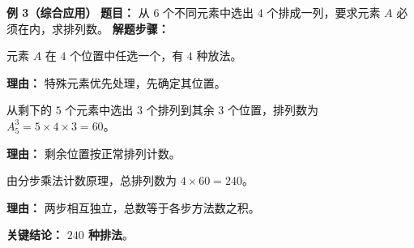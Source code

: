 \begin{examplebox}
	\medskip
	\textbf{\textcolor{CExample}{例 3（综合应用）}}
	\textbf{\textcolor{CExample}{题目：}}
	从 $6$ 个不同元素中选出 $4$ 个排成一列，要求元素 $A$ 必须在内，求排列数。
	\textbf{\textcolor{CExample}{解题步骤：}}
	\begin{description}[style=nextline, leftmargin=2.8em, labelsep=0.5em, itemsep=0.45em]
		\item[\textbf{第一步（先排特殊元素）：}]
			元素 $A$ 在 $4$ 个位置中任选一个，有 $4$ 种放法。
			\par\textbf{理由：} 特殊元素优先处理，先确定其位置。
		\item[\textbf{第二步（排列剩余元素）：}]
			从剩下的 $5$ 个元素中选出 $3$ 个排列到其余 $3$ 个位置，排列数为 $A_5^3 = 5\times4\times3 = 60$。
			\par\textbf{理由：} 剩余位置按正常排列计数。
		\item[\textbf{第三步（乘法原理）：}]
			由分步乘法计数原理，总排列数为 $4 \times 60 = 240$。
			\par\textbf{理由：} 两步相互独立，总数等于各步方法数之积。
	\end{description}
	\textbf{\textcolor{CExample}{关键结论：}}
	\textbf{$240$ 种排法}。
\end{examplebox}

